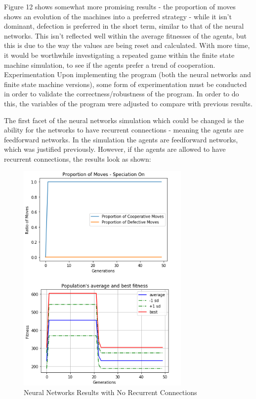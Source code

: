\documentclass[12pt,a4paper]{article}
\makeatletter
\renewcommand\subsection{\@startsection {subsection}{1}{2mm}
                               {3pt plus 2pt minus 1pt}
                               {3pt plus 0pt}
                               {\normalfont\bfseries}}
\makeatother
\begin{document}
Figure 12 shows somewhat more promising results - the proportion of moves shows an evolution of the machines into a preferred strategy - while it isn't dominant, defection is preferred in the short term, similar to that of the neural networks. This isn't reflected well within the average fitnesses of the agents, but this is due to the way the values are being reset and calculated. With more time, it would be worthwhile investigating a repeated game within the finite state machine simulation, to see if the agents prefer a trend of cooperation. \\

\subsection{Experimentation}
Upon implementing the program (both the neural networks and finite state machine versions), some form of experimentation must be conducted in order to validate the correctness/robustness of the program. In order to do this, the variables of the program were adjusted to compare with previous results.

The first facet of the neural networks simulation which could be changed is the ability for the networks to have recurrent connections - meaning the agents are feedforward networks. In the simulation the agents are feedforward networks, which was justified previously. However, if the agents are allowed to have recurrent connections, the results look as shown:

\begin{figure}[H]
	\centering
		\includegraphics[width=0.75\textwidth]{FeedforwardOff}
		\caption{Neural Networks Results with No Recurrent Connections}
\end{figure}
\end{document}
